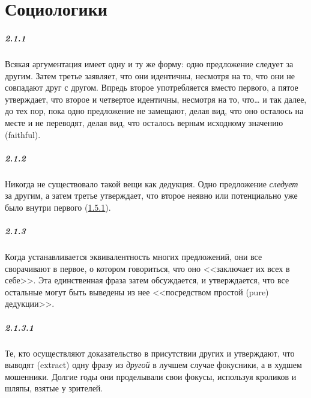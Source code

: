 \chapter{Социологики}

\paragraph{2.1.1}\hypertarget{par:2.1.1}{} Всякая аргументация имеет одну и ту же форму: одно предложение следует за другим. Затем третье заявляет, что они идентичны, несмотря на то, что они не совпадают друг с другом. Впредь второе употребляется вместо первого, а пятое утверждает, что второе и четвертое идентичны, несмотря на то, что{\ldots} и так далее, до тех пор, пока одно предложение не замещают, делая вид, что оно осталось на месте и не переводят, делая вид, что осталось верным исходному значению (faithful).

\paragraph{2.1.2}\hypertarget{par:2.1.2}{} Никогда не существовало такой вещи как дедукция. Одно предложение {\itshape следует} за другим, а затем третье утверждает, что второе неявно или потенциально уже было внутри первого (\hyperlink{par:1.5.1}{1.5.1}).


\paragraph{2.1.3}\hypertarget{par:2.1.3}{} Когда устанавливается эквивалентность многих предложений, они все сворачивают в первое, о котором говориться, что оно <<заключает их всех в себе>>. Эта единственная фраза затем обсуждается, и утверждается, что все остальные могут быть выведены из нее <<посредством простой (pure) дедукции>>.

\paragraph{2.1.3.1}\hypertarget{par:2.1.3.1}{} Те, кто осуществляют доказательство в присутствии других и утверждают, что выводят (extract) одну фразу из {\itshape другой} в лучшем случае фокусники, а в худшем мошенники. Долгие годы они проделывали свои фокусы, используя кроликов и шляпы, взятые у зрителей.

